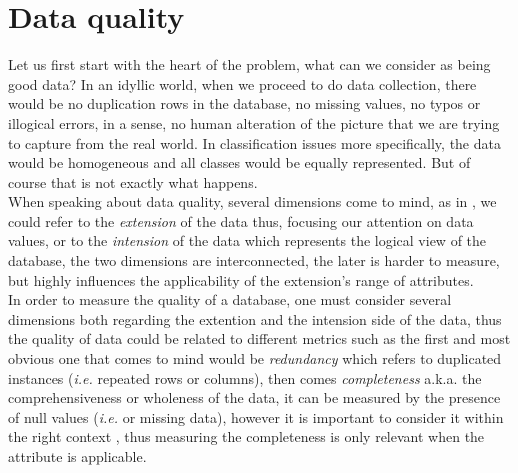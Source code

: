 \documentclass{article}
\begin{document}
\section{Data quality} %
\label{sec:Data quality}
Let us first start with the heart of the problem, what can we consider as being good data? In an idyllic world, when we proceed to do data collection, there would be no duplication rows in the database, no missing values, no typos or illogical errors, in a sense, no human alteration of the picture that we are trying to capture from the real world. In classification issues more specifically, the data would be homogeneous and all classes would be equally represented. But of course that is not exactly what happens. \\
When speaking about data quality, several dimensions come to mind, as in \cite{amazon}, we could refer to the \textit{extension} of the data thus, focusing our attention on data values, or to the \textit{intension} of the data which represents the logical view of the database, the two dimensions are interconnected, the later is harder to measure, but highly influences the applicability of the extension's range of attributes.\\
In order to measure the quality of a database, one must consider several dimensions both regarding the extention and the intension side of the data, thus the quality of data could be related to different metrics such as the first and most obvious one that comes to mind would be \textit{redundancy} which refers to duplicated instances (\textit{i.e.} repeated rows or columns), then comes \textit{completeness} a.k.a. the comprehensiveness or wholeness of the data, it can be measured by the presence of null values (\textit{i.e.} or missing data), however it is important to consider it within the right context  \cite{amazon}, thus measuring the completeness is only relevant when the attribute is applicable. \\
\end{document}
